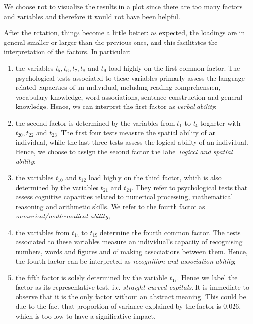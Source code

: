 \documentclass[
]{article}
\theoremstyle{plain}
\begin{document}
We choose not to visualize the results in a plot since there are too
many factors and variables and therefore it would not have been helpful.

After the rotation, things become a little better: as expected, the
loadings are in general smaller or larger than the previous ones, and
this facilitates the interpretation of the factors. In particular:

\begin{enumerate}
    \item 
        the variables $t_5, t_6, t_7, t_8$ and $t_9$ load highly on the first common factor. The psychological tests associated to these variables primarly assess the language-related capacities of an individual, including reading comprehension, vocabulary knowledge, word associations, sentence construction and general knowledge. Hence, we can interpret the first factor as \textit{verbal ability};
    \item 
        the second factor is determined by the variables from $t_1$ to $t_4$ togheter with $t_{20}, t_{22}$ and $t_{23}$. The first four tests measure the spatial ability of an individual, while the last three tests assess the logical ability of an individual. Hence, we choose to assign the second factor the label \textit{logical and spatial ability};
    \item 
        the variables $t_{10}$ and $t_{12}$ load highly on the third factor, which is also determined by the variables $t_{21}$ and $t_{24}$. They refer to psychological tests that assess cognitive capacities related to numerical processing, mathematical reasoning and arithmetic skills. We refer to the fourth factor as \textit{numerical/mathematical ability};
    \item 
        the variables from $t_{14}$ to $t_{19}$ determine the fourth common factor. The tests associated to these variables measure an individual's capacity of recognising  numbers, words and figures and of making associations between them. Hence, the fourth factor can be interpreted as \textit{recognition and association ability}; %
    \item
        the fifth factor is solely determined by the variable $t_{13}$. Hence we label the factor as its representative test, i.e. \textit{straight-curved capitals}. It is immediate to observe that it is the only factor without an abstract meaning. This could be due to the fact that proportion of variance explained by the factor is $0.026$, which is too low to have a significative impact.
\end{enumerate}
\end{document}
